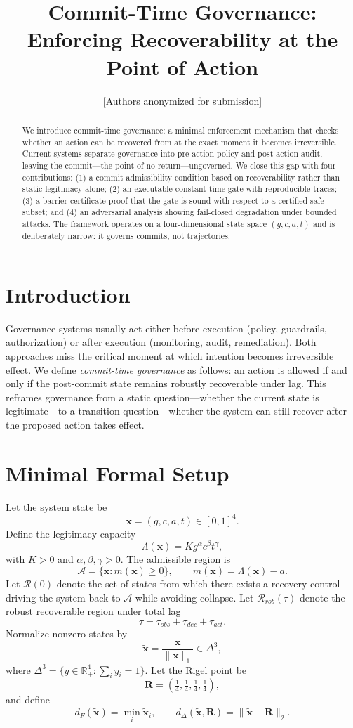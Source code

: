 \documentclass[letterpaper,10pt,conference]{ieeeconf}
\title{\bf Commit-Time Governance: Enforcing Recoverability at the Point of Action}
\author{[Authors anonymized for submission]}
\newcommand{\x}{\mathbf{x}}
\newcommand{\xt}{\tilde{\mathbf{x}}}
\newcommand{\A}{\mathcal{A}}
\newcommand{\Rset}{\mathcal{R}}
\newcommand{\Rrob}{\mathcal{R}_{rob}}
\newcommand{\Lam}{\Lambda}
\newcommand{\Rigel}{\mathbf{R}}
\begin{document}
\maketitle
\thispagestyle{empty}
\pagestyle{empty}
\begin{abstract}
We introduce commit-time governance: a minimal enforcement mechanism that checks whether an action can be recovered from at the exact moment it becomes irreversible. Current systems separate governance into pre-action policy and post-action audit, leaving the commit—the point of no return—ungoverned. We close this gap with four contributions: (1) a commit admissibility condition based on recoverability rather than static legitimacy alone; (2) an executable constant-time gate with reproducible traces; (3) a barrier-certificate proof that the gate is sound with respect to a certified safe subset; and (4) an adversarial analysis showing fail-closed degradation under bounded attacks. The framework operates on a four-dimensional state space $(g,c,a,t)$ and is deliberately narrow: it governs commits, not trajectories.
\end{abstract}
\section{Introduction}
Governance systems usually act either before execution (policy, guardrails, authorization) or after execution (monitoring, audit, remediation). Both approaches miss the critical moment at which intention becomes irreversible effect.
We define \emph{commit-time governance} as follows: an action is allowed if and only if the post-commit state remains robustly recoverable under lag. This reframes governance from a static question—whether the current state is legitimate—to a transition question—whether the system can still recover after the proposed action takes effect.
\section{Minimal Formal Setup}
Let the system state be
\[
\x=(g,c,a,t)\in[0,1]^4.
\]
Define the legitimacy capacity
\[
\Lam(\x)=K g^\alpha c^\beta t^\gamma,
\]
with $K>0$ and $\alpha,\beta,\gamma>0$. The admissible region is
\[
\A=\{\x: m(\x)\ge 0\},\qquad m(\x)=\Lam(\x)-a.
\]
Let $\Rset(0)$ denote the set of states from which there exists a recovery control driving the system back to $\A$ while avoiding collapse. Let $\Rrob(\tau)$ denote the robust recoverable region under total lag
\[
\tau=\tau_{obs}+\tau_{dec}+\tau_{act}.
\]
Normalize nonzero states by
\[
\xt=\frac{\x}{\|\x\|_1}\in\Delta^3,
\]
where $\Delta^3=\{y\in\mathbb{R}^4_+:\sum_i y_i=1\}$. Let the Rigel point be
\[
\Rigel=\left(\tfrac14,\tfrac14,\tfrac14,\tfrac14\right),
\]
and define
\[
d_F(\xt)=\min_i \xt_i,\qquad d_\Delta(\xt,\Rigel)=\|\xt-\Rigel\|_2.
\]
\end{document}
